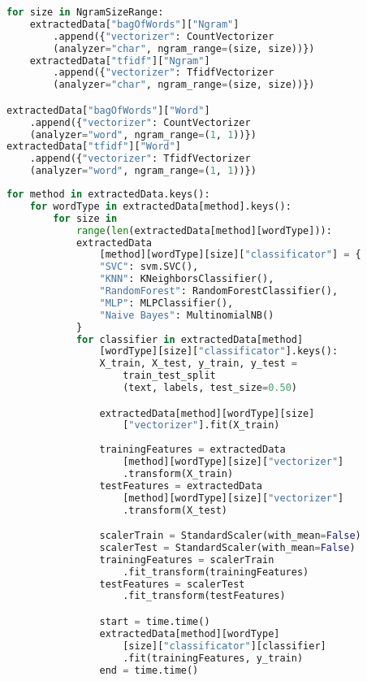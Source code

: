 \begin{lstlisting}[language=Python, caption={Tworzenie wektoryzatorów dzielących tekst na różnej długości ngramy}, captionpos=b, frame=single]
for size in NgramSizeRange:
    extractedData["bagOfWords"]["Ngram"]
        .append({"vectorizer": CountVectorizer
        (analyzer="char", ngram_range=(size, size))})
    extractedData["tfidf"]["Ngram"]
        .append({"vectorizer": TfidfVectorizer
        (analyzer="char", ngram_range=(size, size))})

extractedData["bagOfWords"]["Word"]
    .append({"vectorizer": CountVectorizer
    (analyzer="word", ngram_range=(1, 1))})
extractedData["tfidf"]["Word"]
    .append({"vectorizer": TfidfVectorizer
    (analyzer="word", ngram_range=(1, 1))})

\end{lstlisting}
\begin{lstlisting}[language=Python, caption={Główna pętla programu iterująca po wszystkich badanych metodach i wykonująca na nich pomiary}, captionpos=b, frame=single]
for method in extractedData.keys():
    for wordType in extractedData[method].keys():
        for size in 
            range(len(extractedData[method][wordType])):
            extractedData
                [method][wordType][size]["classificator"] = {
                "SVC": svm.SVC(),
                "KNN": KNeighborsClassifier(),
                "RandomForest": RandomForestClassifier(),
                "MLP": MLPClassifier(),
                "Naive Bayes": MultinomialNB()
            }
            for classifier in extractedData[method]
                [wordType][size]["classificator"].keys():
                X_train, X_test, y_train, y_test = 
                    train_test_split
                    (text, labels, test_size=0.50)

                extractedData[method][wordType][size]
                    ["vectorizer"].fit(X_train)
                
                trainingFeatures = extractedData
                    [method][wordType][size]["vectorizer"]
                    .transform(X_train)
                testFeatures = extractedData
                    [method][wordType][size]["vectorizer"]
                    .transform(X_test)

                scalerTrain = StandardScaler(with_mean=False)
                scalerTest = StandardScaler(with_mean=False)
                trainingFeatures = scalerTrain
                    .fit_transform(trainingFeatures)
                testFeatures = scalerTest
                    .fit_transform(testFeatures)

                start = time.time()
                extractedData[method][wordType]
                    [size]["classificator"][classifier]
                    .fit(trainingFeatures, y_train)
                end = time.time() 
\end{lstlisting}